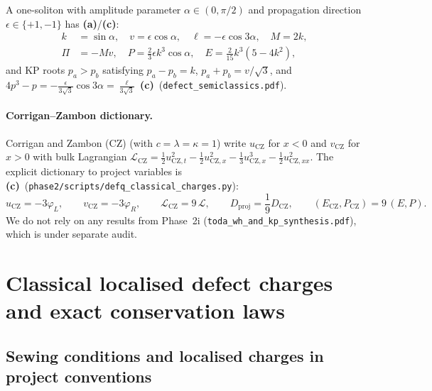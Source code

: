\documentclass[11pt,a4paper]{article}
\newcommand{\La}{\textsf{\textbf{(a)}}}
\newcommand{\Lc}{\textsf{\textbf{(c)}}}
\newcommand{\sclass}{\texttt{phase2/\allowbreak scripts/\allowbreak defq\_\allowbreak classical\_\allowbreak charges.py}}
\theoremstyle{remark}
\begin{document}
A one-soliton with amplitude parameter $\alpha \in (0,\pi/2)$ and propagation
direction $\epsilon \in \{+1,-1\}$ has \La/\Lc:
\begin{align}\label{eq:sol_data}
  k &= \sin\alpha, \quad v = \epsilon\cos\alpha, \quad \ell = -\epsilon\cos 3\alpha, \quad
  M = 2k, \nonumber\\
  \Pi &= -Mv, \quad P = \frac{2}{3}\epsilon k^3\cos\alpha, \quad
  E = \frac{2}{15}k^3(5-4k^2),
\end{align}
and KP roots $p_a > p_b$ satisfying $p_a - p_b = k$, $p_a + p_b = v/\sqrt{3}$,
and $4p^3 - p = -\frac{\epsilon}{3\sqrt{3}}\cos 3\alpha = \frac{\ell}{3\sqrt{3}}$
\Lc\ (\texttt{defect\_semiclassics.pdf}).

\paragraph{Corrigan--Zambon dictionary.}
Corrigan and Zambon (CZ) \cite{CZ} (with $c=\lambda=\kappa=1$) write $u_{\mathrm{CZ}}$
for $x<0$ and $v_{\mathrm{CZ}}$ for $x>0$ with bulk Lagrangian
$\mathcal{L}_{\mathrm{CZ}} = \frac{1}{2}u_{\mathrm{CZ},t}^2 - \frac{1}{2}u_{\mathrm{CZ},x}^2 - \frac{1}{3}u_{\mathrm{CZ},x}^3 - \frac{1}{2}u_{\mathrm{CZ},xx}^2$.
The explicit dictionary to project variables is \Lc\ (\sclass):
\begin{equation}\label{eq:cz_dict}
  u_{\mathrm{CZ}} = -3\varphi_L, \qquad v_{\mathrm{CZ}} = -3\varphi_R, \qquad
  \mathcal{L}_{\mathrm{CZ}} = 9\,\mathcal{L}, \qquad
  D_{\mathrm{proj}} = \frac{1}{9}D_{\mathrm{CZ}}, \qquad
  (E_{\mathrm{CZ}},P_{\mathrm{CZ}}) = 9\,(E,P).
\end{equation}
We do not rely on any results from Phase~2i (\texttt{toda\_wh\_and\_kp\_synthesis.pdf}),
which is under separate audit.

\section{Classical localised defect charges and exact conservation laws}
\label{sec:classical}

\subsection{Sewing conditions and localised charges in project conventions}
\end{document}
